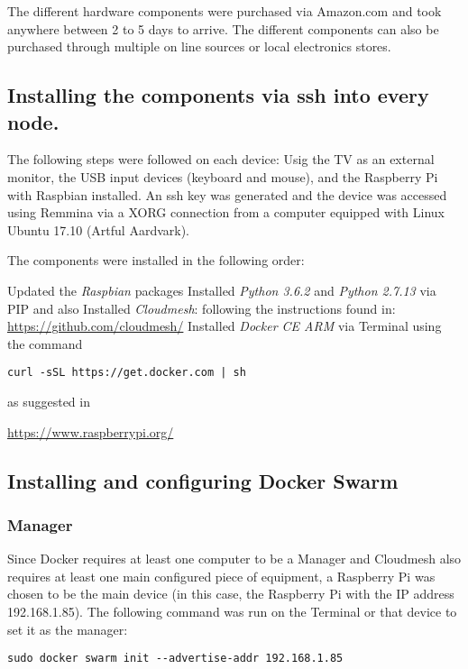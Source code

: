 The different hardware components were purchased via Amazon.com and
took anywhere between 2 to 5 days to arrive. The different components
can also be purchased through multiple on line sources or local
electronics stores.
		
\subsection{Installing the components via ssh into every node.}
	
The following steps were followed on each device: Usig the TV as an
external monitor, the USB input devices (keyboard and mouse), and the
Raspberry Pi with Raspbian installed. An ssh key was generated and the
device was accessed using Remmina via a XORG connection from a
computer equipped with Linux Ubuntu 17.10 (Artful Aardvark).
  
The components were installed in the following order:


Updated the \textit{Raspbian} packages \textbf{\textit{}} Installed
\textit{Python 3.6.2} and \textit{Python 2.7.13} via PIP and also
Installed \textit{Cloudmesh}: following the instructions found in:
\url{https://github.com/cloudmesh/} Installed
\textit{Docker CE ARM} via Terminal using the command

\verb=curl -sSL https://get.docker.com | sh=

 as suggested
in

\url{https://www.raspberrypi.org/}

	
\subsection{Installing and configuring Docker Swarm}
  
\subsubsection{Manager}

Since Docker requires at least one computer to be a Manager and
Cloudmesh also requires at least one main configured piece of
equipment, a Raspberry Pi was chosen to be the main device (in this
case, the Raspberry Pi with the IP address 192.168.1.85).  The
following command was run on the Terminal or that device to set it as
the manager: 

\verb|sudo docker swarm init --advertise-addr 192.168.1.85|
	
